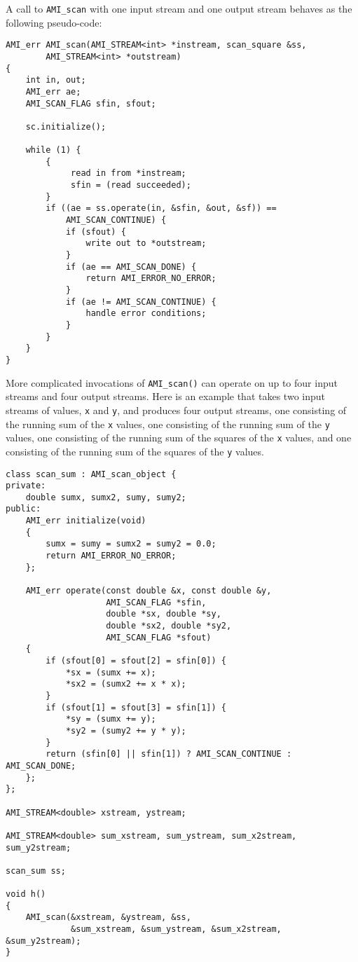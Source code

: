 A call to \verb|AMI_scan| with one input stream and one output stream
behaves as the following pseudo-code:

\begin{verbatim} 
AMI_err AMI_scan(AMI_STREAM<int> *instream, scan_square &ss, 
        AMI_STREAM<int> *outstream)
{
    int in, out;
    AMI_err ae;    
    AMI_SCAN_FLAG sfin, sfout;

    sc.initialize();

    while (1) {
        {
             read in from *instream;
             sfin = (read succeeded);
        }
        if ((ae = ss.operate(in, &sfin, &out, &sf)) == 
            AMI_SCAN_CONTINUE) {
            if (sfout) {
                write out to *outstream;
            }
            if (ae == AMI_SCAN_DONE) {
                return AMI_ERROR_NO_ERROR;
            }
            if (ae != AMI_SCAN_CONTINUE) {
                handle error conditions;
            }
        }
    }
}
\end{verbatim}

More complicated invocations of \verb|AMI_scan()| can operate on up
to four input streams and four output streams.  Here is an example
that takes two input streams of values, \verb|x| and \verb|y|, and
produces four output streams, 
one consisting of the running sum of the
\verb|x| values,
one consisting of the running sum of the
\verb|y| values,
one consisting of the running sum of the
squares of the \verb|x| values,
and
one consisting of the running sum of the
squares of the \verb|y| values.

\begin{verbatim}
class scan_sum : AMI_scan_object {
private:
    double sumx, sumx2, sumy, sumy2;
public:
    AMI_err initialize(void)
    {
        sumx = sumy = sumx2 = sumy2 = 0.0;
        return AMI_ERROR_NO_ERROR;
    };

    AMI_err operate(const double &x, const double &y, 
                    AMI_SCAN_FLAG *sfin,
                    double *sx, double *sy, 
                    double *sx2, double *sy2, 
                    AMI_SCAN_FLAG *sfout)
    {
        if (sfout[0] = sfout[2] = sfin[0]) {
            *sx = (sumx += x);
            *sx2 = (sumx2 += x * x);
        }
        if (sfout[1] = sfout[3] = sfin[1]) {
            *sy = (sumx += y);
            *sy2 = (sumy2 += y * y);
        }        
        return (sfin[0] || sfin[1]) ? AMI_SCAN_CONTINUE : AMI_SCAN_DONE;
    };
};

AMI_STREAM<double> xstream, ystream;

AMI_STREAM<double> sum_xstream, sum_ystream, sum_x2stream, sum_y2stream;

scan_sum ss;

void h()
{
    AMI_scan(&xstream, &ystream, &ss, 
             &sum_xstream, &sum_ystream, &sum_x2stream, &sum_y2stream);
}
\end{verbatim}


